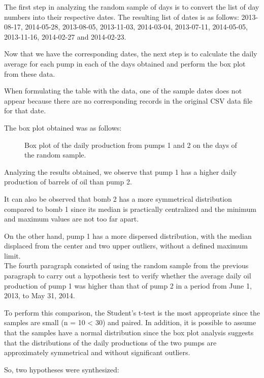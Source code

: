 \documentclass[conference]{IEEEtran}
\begin{document}
The first step in analyzing the random sample of days is to convert the list of day numbers into their respective dates. The resulting list of dates is as follows: 2013-08-17, 2014-05-28, 2013-08-05, 2013-11-03, 2014-03-04, 2013-07-11, 2014-05-05, 2013-11-16, 2014-02-27 and 2014-02-23.

Now that we have the corresponding dates, the next step is to calculate the daily average for each pump in each of the days obtained and perform the box plot from these data.

When formulating the table with the data, one of the sample dates does not appear because there are no corresponding records in the original CSV data file for that date.

The box plot obtained was as follows:

\begin{figure}[H]
    \caption{Box plot of the daily production from pumps 1 and 2 on the days of the random sample.}
    \label{pump_boxplot_randomSample}
\end{figure}

Analyzing the results obtained, we observe that pump 1 has a higher daily production of barrels of oil than pump 2.

It can also be observed that bomb 2 has a more symmetrical distribution compared to bomb 1 since its median is practically centralized and the minimum and maximum values are not too far apart.

On the other hand, pump 1 has a more dispersed distribution, with the median displaced from the center and two upper outliers, without a defined maximum limit.\\

The fourth paragraph consisted of using the random sample from the previous paragraph to carry out a hypothesis test to verify whether the average daily oil production of pump 1 was higher than that of pump 2 in a period from June 1, 2013, to May 31, 2014.

To perform this comparison, the Student's t-test is the most appropriate since the samples are small (n = 10 < 30) and paired. In addition, it is possible to assume that the samples have a normal distribution since the box plot analysis suggests that the distributions of the daily productions of the two pumps are approximately symmetrical and without significant outliers.

So, two hypotheses were synthesized:
\end{document}
